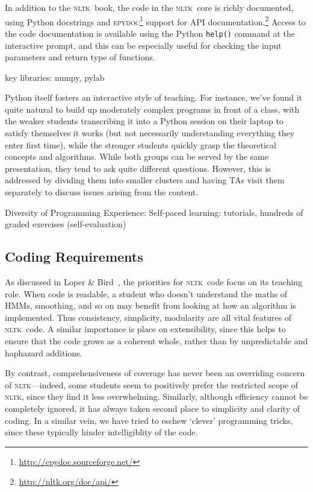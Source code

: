 \documentclass[11pt]{article}
\newcommand{\NLTK}{\textsc{nltk}}
\newcommand{\code}[1]{\texttt{\small #1}}
\begin{document}
In addition to the \NLTK\ book, the code in the \NLTK\ core is richly
documented, using Python docstrings and
\textsc{epydoc}\footnote{\url{http://epydoc.sourceforge.net/}} support
for API documentation.\footnote{\url{http://nltk.org/doc/api/}} Access
to the code documentation is available using the Python \code{help()}
command at the interactive prompt, and this can be especially useful
for checking the input parameters and return type of functions.


key libraries: numpy, pylab

Python itself fosters an
interactive style of teaching.  For instance, we've found it quite
natural to build up moderately complex programs in front of a class,
with the weaker students transcribing it into a Python session on
their laptop to satisfy themselves it works (but not necessarily
understanding everything they enter first time), while the stronger
students quickly grasp the theoretical concepts and algorithms.  While
both groups can be served by the same presentation, they tend to ask
quite different questions.  However, this is addressed by dividing
them into smaller clusters and having TAs visit them separately to
discuss issues arising from the content.

Diversity of Programming Experience:
Self-paced learning: tutorials, hundreds of graded exercises (self-evaluation)



\subsection{Coding Requirements}

As discussed in Loper \& Bird~, the priorities for \NLTK\ code
focus on its teaching role. When code is readable, a student who
doesn't understand the maths of HMMs, smoothing, and so on may benefit
from looking at how an algorithm is implemented. Thus consistency,
simplicity, modularity are all vital features of \NLTK\ code. A
similar importance is place on extensibility, since this helps to
ensure that the code grows as a coherent whole, rather than by
unpredictable and haphazard additions.  

By contrast,
comprehensiveness of coverage has never been an overriding concern of
\NLTK---indeed, some students seem to positively prefer the restricted
scope of \NLTK, since they find it less overwhelming.
Similarly, although efficiency cannot be completely ignored, it has
always taken second place to simplicity and clarity of coding. In a
similar vein, we have tried to eschew `clever' programming tricks,
since these typically hinder intelligiblity of the code.
\end{document}
